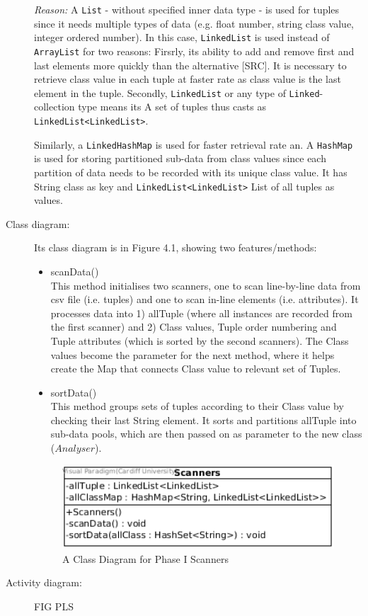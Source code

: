\begin{description}
\textit{Reason: } A \texttt{List} - without specified inner data type - is used for tuples since it needs multiple types of data (e.g. float number, string class value, integer ordered number). In this case, \texttt{LinkedList} is used instead of \texttt{ArrayList} for two reasons: Firsrly, its ability to add and remove first and last elements more quickly than the alternative [SRC]. It is necessary to retrieve class value in each tuple at faster rate as class value is the last element in the tuple. Secondly, \texttt{LinkedList} or any type of \texttt{Linked}-collection type means its  A set of tuples thus casts as \texttt{LinkedList<LinkedList>}.

Similarly, a \texttt{LinkedHashMap} is used for faster retrieval rate an. A \texttt{HashMap} is used for storing partitioned sub-data from class values since each partition of data needs to be recorded with its unique class value. It has String class as key and \texttt{LinkedList<LinkedList>} List of all tuples as values. 

\item[Class diagram: ] 

Its class diagram is in Figure 4.1, showing two features/methods:
\begin{itemize}
	\item{scanData()} \\
	This method initialises two scanners, one to scan line-by-line data from csv file (i.e. tuples) and one to scan in-line elements (i.e. attributes).
	It processes data into 1) allTuple (where all instances are recorded from the first scanner) and 2) Class values, Tuple order numbering and Tuple attributes (which is sorted by the second scanners).
	The Class values become the parameter for the next method, where it helps create the Map that connects Class value to relevant set of Tuples.
	\item{sortData()} \\
	This method groups sets of tuples according to their Class value by checking their last String element. It sorts and partitions allTuple into sub-data pools, which are then passed on as parameter to the new class ($Analyser$).
	
\end{itemize}

\begin{figure}[!htbp]
    \centering
    \includegraphics[width=4in]{figures/class_scanners}
    \caption[A Class Diagram for Phase I Scanners]{A Class Diagram for Phase I Scanners}
    \label{fig:figure4_2}
\end{figure}

\item[Activity diagram: ] 

FIG PLS

\end{description}

